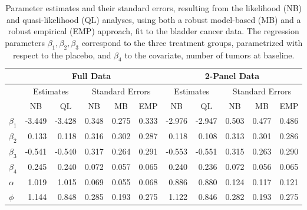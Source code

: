 \documentclass[12pt]{article}
\begin{document}
\clearpage
\begin{table}[h]
\caption{Parameter estimates and their standard errors, resulting from
  the likelihood (NB) and quasi-likelihood (QL) analyses, using both a robust model-based (MB) and a robust empirical (EMP) approach, fit to the bladder cancer data. The regression parameters $\beta_1,\beta_2,\beta_3$ correspond to the three treatment groups, parametrized with respect to the placebo, and $\beta_4$ to the covariate, number of tumors at baseline.}\label{Tab:EstimatesOriginal}
\begin{center}
\begin{tabular}{l |rr| rrr ||rr| rrr}
&\multicolumn{5}{c}{Full Data }&\multicolumn{5}{c}{2-Panel Data}\\ \hline
&\multicolumn{2}{c}{Estimates}&\multicolumn{3}{c}{Standard Errors} & \multicolumn{2}{c}{Estimates}&\multicolumn{3}{c}{Standard Errors}\\ \hline
&\multicolumn{1}{c}{NB}&\multicolumn{1}{c}{QL} & \multicolumn{1}{c}{NB}&\multicolumn{1}{c}{MB}&\multicolumn{1}{c}{EMP} &\multicolumn{1}{c}{NB}&\multicolumn{1}{c}{QL}& \multicolumn{1}{c}{NB}&\multicolumn{1}{c}{MB}&\multicolumn{1}{c}{EMP}\\ \hline
 $\beta_1$  &    -3.449  &    -3.428  &     0.348  &     0.275  &   0.333  &      -2.976  &      -2.947  &       0.503  &       0.477  &     0.486  \\
 $\beta_2$  &     0.133  &     0.118  &     0.316  &     0.302  &   0.287  &       0.118  &       0.108  &       0.313  &       0.301  &     0.286  \\
 $\beta_3$  &    -0.541  &    -0.540  &     0.317  &     0.264  &   0.291  &      -0.553  &      -0.551  &       0.315  &       0.263  &     0.290  \\
 $\beta_4$   &     0.245  &     0.240  &     0.072  &     0.057  &   0.065  &       0.240  &       0.236  &       0.072  &       0.056  &     0.065  \\
 $\alpha$   &     1.019  &     1.015  &     0.069  &     0.055  &   0.068  &       0.886  &       0.880  &       0.124  &       0.117  &     0.121  \\
 $\phi$     &     1.144  &     0.848  &     0.285  &     0.193  &   0.275  &       1.122  &       0.846  &       0.282  &       0.193  &     0.275 

 \end{tabular}
\end{center}
\end{table}
\end{document}
